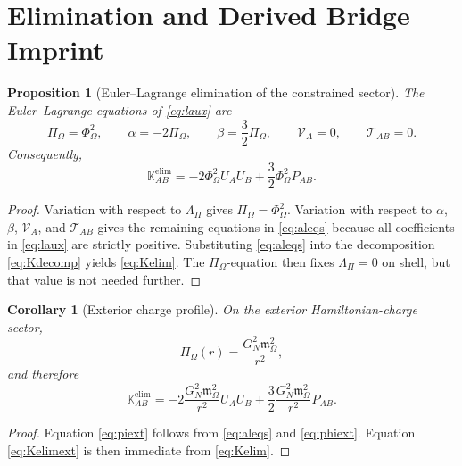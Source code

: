 \documentclass[11pt]{article}
\newcommand{\ProjSub}{P}
\newcommand{\FlowPot}{\Phi_\Omega}
\newcommand{\BalanceField}{\Pi_\Omega}
\newcommand{\BalMult}{\Lambda_\Pi}
\newcommand{\HamChargeOmega}{\mathfrak m_\Omega}
\newcommand{\AuxPol}{\mathbb K}
\newtheorem{proposition}{Proposition}
\newtheorem{corollary}{Corollary}
\begin{document}
\section{Elimination and Derived Bridge Imprint}

\begin{proposition}[Euler--Lagrange elimination of the constrained sector]
\label{prop:elim}
The Euler--Lagrange equations of \eqref{eq:laux} are
\begin{equation}
\BalanceField=\FlowPot^2,
\qquad
\alpha=-2\BalanceField,
\qquad
\beta=\frac32\BalanceField,
\qquad
\mathcal V_A=0,
\qquad
\mathcal T_{AB}=0.
\label{eq:aleqs}
\end{equation}
Consequently,
\begin{equation}
\AuxPol^{\mathrm{elim}}_{AB}
=
-2\FlowPot^2U_AU_B
+\frac32\FlowPot^2\ProjSub_{AB}.
\label{eq:Kelim}
\end{equation}
\end{proposition}

\begin{proof}
Variation with respect to \(\BalMult\) gives \(\BalanceField=\FlowPot^2\). Variation with respect to \(\alpha\), \(\beta\), \(\mathcal V_A\), and \(\mathcal T_{AB}\) gives the remaining equations in \eqref{eq:aleqs} because all coefficients in \eqref{eq:laux} are strictly positive. Substituting \eqref{eq:aleqs} into the decomposition \eqref{eq:Kdecomp} yields \eqref{eq:Kelim}. The \(\BalanceField\)-equation then fixes \(\BalMult=0\) on shell, but that value is not needed further.
\end{proof}

\begin{corollary}[Exterior charge profile]
\label{cor:ext}
On the exterior Hamiltonian-charge sector,
\begin{equation}
\BalanceField(r)=\frac{G_N^2\HamChargeOmega^2}{r^2},
\label{eq:piext}
\end{equation}
and therefore
\begin{equation}
\AuxPol^{\mathrm{elim}}_{AB}
=
-2\frac{G_N^2\HamChargeOmega^2}{r^2}U_AU_B
+\frac32\frac{G_N^2\HamChargeOmega^2}{r^2}\ProjSub_{AB}.
\label{eq:Kelimext}
\end{equation}
\end{corollary}

\begin{proof}
Equation \eqref{eq:piext} follows from \eqref{eq:aleqs} and \eqref{eq:phiext}. Equation \eqref{eq:Kelimext} is then immediate from \eqref{eq:Kelim}.
\end{proof}
\end{document}

